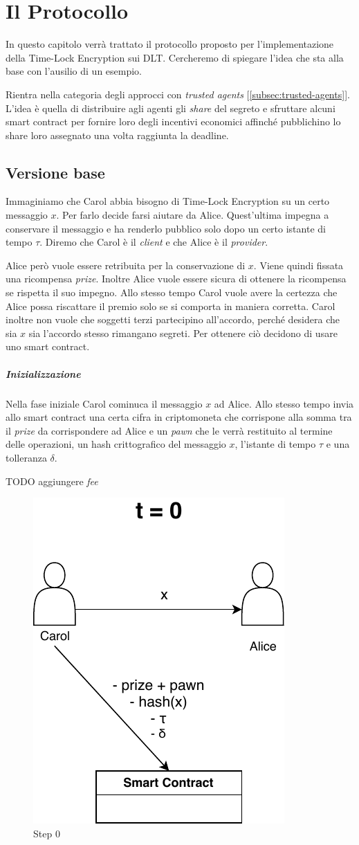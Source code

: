 \chapter{Il Protocollo}
\label{chap:protocollo}

In questo capitolo verrà trattato il protocollo proposto per l'implementazione
della Time-Lock Encryption sui DLT.
Cercheremo di spiegare
l'idea che sta alla base con l'ausilio di un esempio.

Rientra nella categoria degli approcci
con \textit{trusted agents} [\ref{subsec:trusted-agents}].
L'idea è quella di distribuire agli agenti gli \textit{share} del segreto
e sfruttare alcuni smart contract per
fornire loro degli incentivi economici affinché pubblichino lo share 
loro assegnato una volta raggiunta la deadline.
\section{Versione base}
\label{sec:versione-base}
Immaginiamo che Carol abbia bisogno di Time-Lock Encryption su un certo messaggio $ x $.
Per farlo decide farsi aiutare da Alice. Quest'ultima
impegna a conservare il messaggio e ha renderlo pubblico solo dopo un
certo istante di tempo $ \tau $.
Diremo che Carol è il \textit{client} e che Alice è il \textit{provider}.

Alice però vuole essere retribuita per la conservazione di $ x $. Viene quindi fissata
una ricompensa \textit{prize}. Inoltre Alice vuole essere sicura di
ottenere la ricompensa se rispetta il suo impegno. Allo stesso tempo Carol
vuole avere la certezza che Alice possa riscattare il premio solo se si comporta
in maniera corretta.
Carol inoltre non vuole che soggetti terzi partecipino all'accordo, perché desidera
che sia $ x $ sia l'accordo stesso rimangano segreti.
Per ottenere ciò decidono di usare uno smart contract.

\paragraph{Inizializzazione}
Nella fase iniziale Carol cominuca il messaggio $ x $ ad Alice. Allo stesso tempo invia
allo smart contract una certa cifra in criptomoneta
che corrispone alla somma tra il \textit{prize} da corrispondere ad Alice e un
\textit{pawn} che le verrà restituito al termine delle operazioni, un hash
crittografico del messaggio $ x $, l'istante di tempo $ \tau $ e una tolleranza $ \delta $.

TODO aggiungere \textit{fee}
\begin{figure}[H]
	\centering
	\includegraphics[width=0.3\linewidth]{images/chap_protocollo/base-creazione.pdf}
	\caption{Step 0}
\end{figure}


